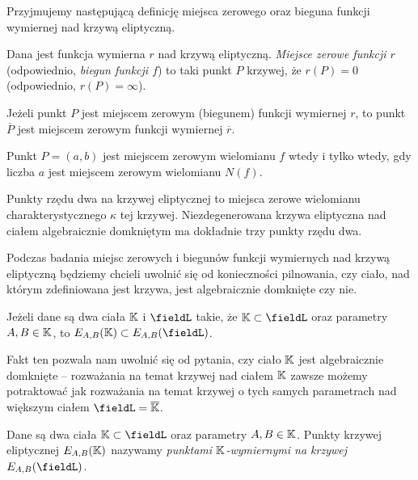 Przyjmujemy następującą definicję
miejsca zerowego oraz bieguna funkcji wymiernej nad krzywą eliptyczną.

\begin{definition}
Dana jest funkcja wymierna $r$ nad krzywą eliptyczną.
\emph{Miejsce zerowe funkcji $r$} (odpowiednio, \emph{biegun funkcji $f$})
to taki punkt $P$ krzywej, że $r(P) = 0$ (odpowiednio, $r(P) = \infty$).
\end{definition}

\begin{fact}
Jeżeli punkt $P$ jest miejscem zerowym (biegunem) funkcji wymiernej $r$,
to punkt $\overline{P}$ jest miejscem zerowym funkcji wymiernej $\overline{r}$.
\end{fact}

\begin{fact}\label{zero_of_norm_fact}
Punkt $P = (a, b)$ jest miejscem zerowym wielomianu $f$ wtedy i tylko wtedy,
gdy liczba $a$ jest miejscem zerowym wielomianu $N(f)$.
\end{fact}

\begin{fact}
Punkty rzędu dwa na krzywej eliptycznej
to miejsca zerowe wielomianu charakterystycznego $\kappa$ tej krzywej.
Niezdegenerowana krzywa eliptyczna nad ciałem algebraicznie domkniętym
ma dokładnie trzy punkty rzędu dwa.
\end{fact}

Podczas badania miejsc zerowych i biegunów
funkcji wymiernych nad krzywą eliptyczną
będziemy chcieli uwolnić się od konieczności pilnowania,
czy ciało, nad którym zdefiniowana jest krzywa,
jest algebraicznie domknięte czy nie.

\begin{fact}
Jeżeli dane są dwa ciała $\mathbb{K}$ i $\fieldL$ takie, że $\K \subset \fieldL$
oraz parametry $A,B \in \mathbb{K}$,
to $E_{A,B}(\K) \subset E_{A,B}(\fieldL)$.
\end{fact}

Fakt ten pozwala nam uwolnić się od pytania,
czy ciało $\mathbb{K}$ jest algebraicznie domknięte --
rozważania na temat krzywej nad ciałem $\mathbb{K}$
zawsze możemy potraktować
jak rozważania na temat krzywej o tych samych parametrach
nad większym ciałem $\fieldL = \overline{\K}$.

\begin{definition}
Dane są dwa ciała $\K \subset \fieldL$ oraz parametry $A, B \in \mathbb{K}$.
Punkty krzywej eliptycznej $E_{A,B}(\mathbb{K})$
nazywamy \emph{punktami $\mathbb{K}$-wymiernymi na krzywej $E_{A,B}(\fieldL)$}.
\end{definition}


